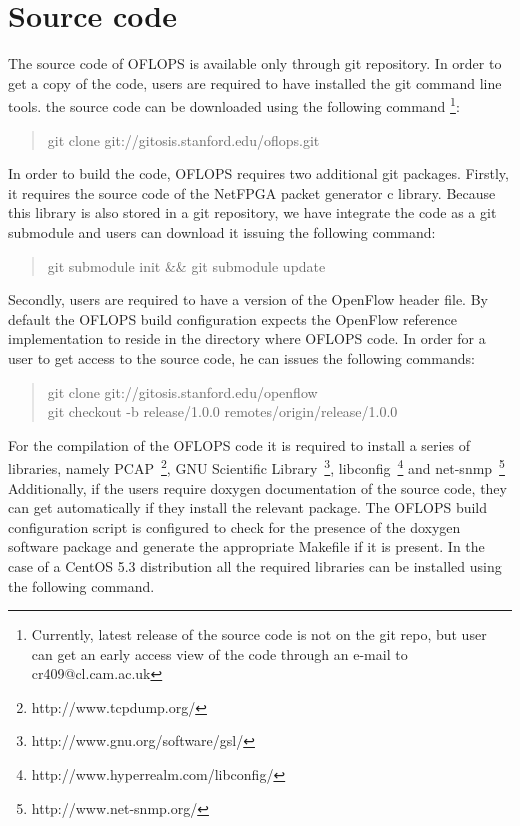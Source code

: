 \documentclass{book}
\begin{document}
\section{Source code}

The source code of OFLOPS is available only through git repository.
In order to get a copy of the code, users are required to have installed 
the git command line tools. the source code can be downloaded using the 
following command \footnote{Currently, latest release of the source code is not 
on the git repo, but user can get an early access view of the code through 
an e-mail to cr409@cl.cam.ac.uk}: 
\begin{quote}
    git clone git://gitosis.stanford.edu/oflops.git
\end{quote}

In order to build the code, OFLOPS requires two additional git packages. 
Firstly, it requires the source code of the NetFPGA packet 
generator c library. Because this library is also stored in a git repository, 
we have integrate the code as a git submodule and users can download it
issuing the following command:

\begin{quote}
    git submodule init \&\& git submodule update
\end{quote}

Secondly, users are required to have a version of the OpenFlow header file.
By default the OFLOPS build configuration expects the OpenFlow reference
implementation to reside in the directory where OFLOPS code. In order
for a user to get access to the source code, he can issues the following
commands:

\begin{quote}
    git clone git://gitosis.stanford.edu/openflow \\
    git checkout -b release/1.0.0 remotes/origin/release/1.0.0
\end{quote}

For the compilation of the OFLOPS code it is required to install a
series of libraries, namely PCAP~\footnote{http://www.tcpdump.org/}, 
GNU Scientific Library~\footnote{http://www.gnu.org/software/gsl/}, 
libconfig~\footnote{http://www.hyperrealm.com/libconfig/} 
and net-snmp~\footnote{http://www.net-snmp.org/} Additionally, if the users 
require doxygen documentation of the source code, they can get automatically 
if they install the relevant package. The OFLOPS build configuration script 
is configured to check for the presence of the 
doxygen software package and generate the appropriate Makefile if it is 
present. In the case of a CentOS 5.3 distribution all the required libraries 
can be installed using the following command.
\end{document}
